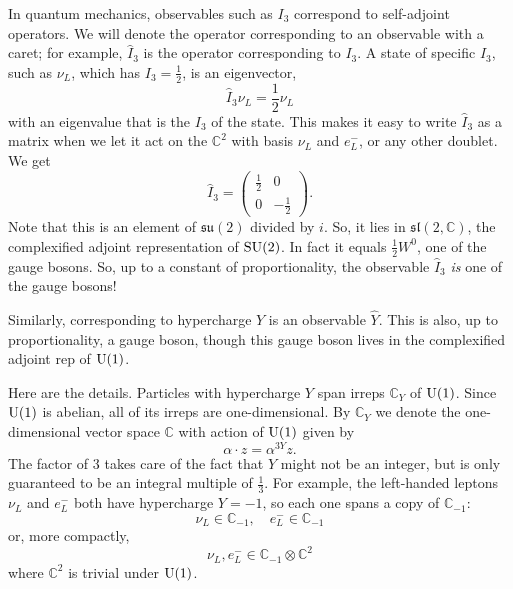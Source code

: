 \documentclass{article}
\newcommand{\C}{{\mathbb C}}  %
\newcommand{\U}{{\rm U}}    %
\newcommand{\SU}{{\rm SU}}    %
\renewcommand{\sl}{\mathfrak{sl}} %
\newcommand{\su}{{\mathfrak{su}}}  %
\newcommand{\half}{\frac{1}{2}} %
\newcommand{\third}{\frac{1}{3}} %
\begin{document}
In quantum mechanics, observables such as $I_3$ correspond to self-adjoint
operators.  We will denote the operator corresponding to an observable with a
caret; for example, $\hat{I}_3$ is the operator corresponding to $I_3$. A state
of specific $I_3$, such as $\nu_L$, which has $I_3 = \half$, is an eigenvector,
\[ \hat{I}_3 \nu_L = \half \nu_L \]
with an eigenvalue that is the $I_3$ of the state. This makes it easy to write
$\hat{I}_3$ as a matrix when we let it act on the $\C^2$ with basis $\nu_L$ and
$e^-_L$, or any other doublet. We get
\[ \hat{I}_3 = \left(\begin{array}{cc} \half & 0 \\ 0 & -\half \end{array} \right). \]
Note that this is an element of $\su(2)$ divided by $i$.   So, it lies in
$\sl(2, \C)$, the complexified adjoint representation of $\SU(2)$.  
In fact it equals $\half W^0$, one of the gauge bosons. So, up to a constant
of proportionality, the observable $\hat{I}_3$ \emph{is} one of the gauge
bosons!

Similarly, corresponding to hypercharge $Y$ is an observable $\hat{Y}$. This is
also, up to proportionality, a gauge boson, though this gauge boson lives in
the complexified adjoint rep of $\U(1)$.

Here are the details. Particles with hypercharge $Y$ span irreps $\C_Y$ of $\U(1)$. Since
$\U(1)$ is abelian, all of its irreps are one-dimensional.  By $\C_Y$ we denote
the one-dimensional vector space $\C$ with action of $\U(1)$ given by 
\[ \alpha \cdot z = \alpha^{3Y} z. \]
The factor of $3$ takes care of the fact that $Y$ might not be an integer, 
but is only guaranteed to be an integral multiple of $\third$. 
For example, the left-handed leptons $\nu_L$ and $e^-_L$ both have hypercharge
$Y = -1$, so each one spans a copy of $\C_{-1}$:
\[ \nu_L \in \C_{-1}, \quad e^-_L \in \C_{-1} \]
or, more compactly, 
\[ \nu_L, e^-_L \in \C_{-1} \otimes \C^2 \]
where $\C^2$ is trivial under $\U(1)$. 
\end{document}
